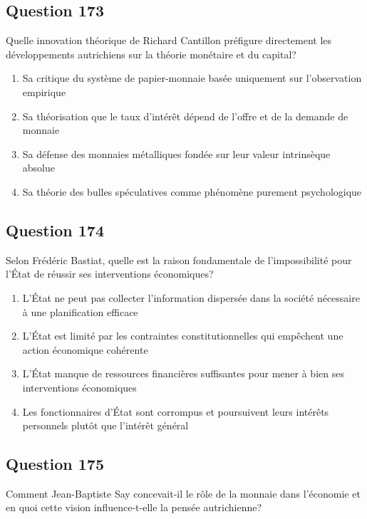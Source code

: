 \documentclass[12pt,a4paper]{article}
\begin{document}
\bigskip


\subsection*{Question 173}
Quelle innovation théorique de Richard Cantillon préfigure directement les développements autrichiens sur la théorie monétaire et du capital?

\begin{enumerate}[label=\Alph*., leftmargin=*]
\item Sa critique du système de papier-monnaie basée uniquement sur l'observation empirique
\item Sa théorisation que le taux d'intérêt dépend de l'offre et de la demande de monnaie
\item Sa défense des monnaies métalliques fondée sur leur valeur intrinsèque absolue
\item Sa théorie des bulles spéculatives comme phénomène purement psychologique
\end{enumerate}

\bigskip


\subsection*{Question 174}
Selon Frédéric Bastiat, quelle est la raison fondamentale de l'impossibilité pour l'État de réussir ses interventions économiques?

\begin{enumerate}[label=\Alph*., leftmargin=*]
\item L'État ne peut pas collecter l'information dispersée dans la société nécessaire à une planification efficace
\item L'État est limité par les contraintes constitutionnelles qui empêchent une action économique cohérente
\item L'État manque de ressources financières suffisantes pour mener à bien ses interventions économiques
\item Les fonctionnaires d'État sont corrompus et poursuivent leurs intérêts personnels plutôt que l'intérêt général
\end{enumerate}

\bigskip


\subsection*{Question 175}
Comment Jean-Baptiste Say concevait-il le rôle de la monnaie dans l'économie et en quoi cette vision influence-t-elle la pensée autrichienne?
\end{document}
